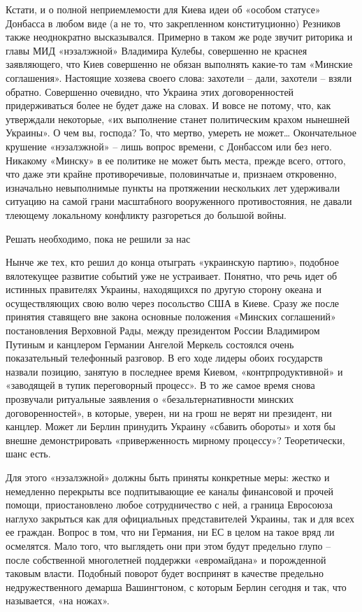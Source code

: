 Кстати, и о полной неприемлемости для Киева идеи об «особом статусе» Донбасса в любом виде (а не то, что закрепленном конституционно) Резников также неоднократно высказывался. Примерно в таком же роде звучит риторика и главы МИД «нэзалэжной» Владимира Кулебы, совершенно не краснея заявляющего, что Киев совершенно не обязан выполнять какие-то там «Минские соглашения». Настоящие хозяева своего слова: захотели – дали, захотели – взяли обратно. Совершенно очевидно, что Украина этих договоренностей придерживаться более не будет даже на словах. И вовсе не потому, что, как утверждали некоторые, «их выполнение станет политическим крахом нынешней Украины». О чем вы, господа? То, что мертво, умереть не может… Окончательное крушение «нэзалэжной» – лишь вопрос времени, с Донбассом или без него. Никакому «Минску» в ее политике не может быть места, прежде всего, оттого, что даже эти крайне противоречивые, половинчатые и, признаем откровенно, изначально невыполнимые пункты на протяжении нескольких лет удерживали ситуацию на самой грани масштабного вооруженного противостояния, не давали тлеющему локальному конфликту разгореться до большой войны.

Решать необходимо, пока не решили за нас

Нынче же тех, кто решил до конца отыграть «украинскую партию», подобное
вялотекущее развитие событий уже не устраивает. Понятно, что речь идет об
истинных правителях Украины, находящихся по другую сторону океана и
осуществляющих свою волю через посольство США в Киеве. Сразу же после принятия
ставящего вне закона основные положения «Минских соглашений» постановления
Верховной Рады, между президентом России Владимиром Путиным и канцлером
Германии Ангелой Меркель состоялся очень показательный телефонный разговор. В
его ходе лидеры обоих государств назвали позицию, занятую в последнее время
Киевом, «контрпродуктивной» и «заводящей в тупик переговорный процесс». В то же
самое время снова прозвучали ритуальные заявления о «безальтернативности
минских договоренностей», в которые, уверен, ни на грош не верят ни президент,
ни канцлер. Может ли Берлин принудить Украину «сбавить обороты» и хотя бы
внешне демонстрировать «приверженность мирному процессу»? Теоретически, шанс
есть.

Для этого «нэзалэжной» должны быть приняты конкретные меры: жестко и немедленно
перекрыты все подпитывающие ее каналы финансовой и прочей помощи,
приостановлено любое сотрудничество с ней, а граница Евросоюза наглухо
закрыться как для официальных представителей Украины, так и для всех ее
граждан. Вопрос в том, что ни Германия, ни ЕС в целом на такое вряд ли
осмелятся. Мало того, что выглядеть они при этом будут предельно глупо – после
собственной многолетней поддержки «евромайдана» и порожденной таковым власти.
Подобный поворот будет воспринят в качестве предельно недружественного демарша
Вашингтоном, с которым Берлин сегодня и так, что называется, «на ножах».

